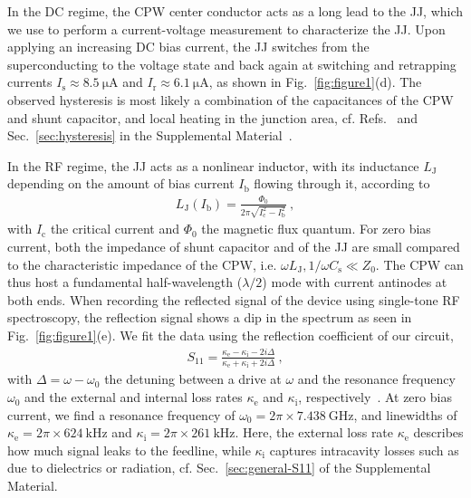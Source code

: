% 
In the DC regime, the CPW center conductor acts as a long lead to the JJ, which we use to perform a current-voltage measurement to characterize the JJ.
% 
Upon applying an increasing DC bias current, the JJ switches from the superconducting to the voltage state and back again at switching and retrapping currents $I_\text{s}\approx\SI{8.5}{\micro\ampere}$ and $I_\text{r}\approx\SI{6.1}{\micro\ampere}$, as shown in Fig.~\ref{fig:figure1}(d).
% 
The observed hysteresis is most likely a combination of the capacitances of the CPW and shunt capacitor, and local heating in the junction area, cf. Refs.~\cite{tinkhamIntroductionSuperconductivity1996,skocpolSelfHeatingHotspots1974,hazraHysteresisSuperconductingShort2010,kumarReversibilitySuperconductingNb2015} and Sec.~\ref{sec:hysteresis} in the Supplemental Material~\cite{SeeSupplementalMaterial}.

In the RF regime, the JJ acts as a nonlinear inductor, with its inductance $L_\text{J}$ depending on the amount of bias current $I_\text{b}$ flowing through it, according to
% 
\begin{align}
L_\text{J}(I_\text{b})= \frac{\Phi_0}{2\pi \sqrt{I_\text{c}^2-I_\text{b}^2}}\ ,
\label{eq:Lj-of-I}
\end{align}
% 
with $I_\text{c}$ the critical current and $\Phi_0$ the magnetic flux quantum.
% 
For zero bias current, both the impedance of shunt capacitor and of the JJ are small compared to the characteristic impedance of the CPW, i.e. $\omega L_\text{J},1/\omega C_\text{s} \ll Z_0$.
% 
The CPW can thus host a fundamental half-wavelength ($\lambda/2$) mode with current antinodes at both ends.
% 
When recording the reflected signal of the device using single-tone RF spectroscopy, the reflection signal shows a dip in the spectrum as seen in Fig.~\ref{fig:figure1}(e).
% 
We fit the data using the reflection coefficient of our circuit,
% 
\begin{align}
S_{11} = \frac{\kappa_\text{e}-\kappa_\text{i}-2i\Delta}{\kappa_\text{e}+\kappa_\text{i}+2i\Delta}\ ,
\label{eq:general:S11}
\end{align}
% 
with $\Delta=\omega-\omega_0$ the detuning between a drive at $\omega$ and the resonance frequency $\omega_0$ and the external and internal loss rates $\kappa_\text{e}$ and $\kappa_\text{i}$, respectively~\cite{bosmanBroadbandArchitectureGalvanically2015c}.
% 
At zero bias current, we find a resonance frequency of $\omega_0=2\pi\times\SI{7.438}{\giga\hertz}$, and linewidths of $\kappa_\text{e}=2\pi\times\SI{624}{\kilo\hertz}$ and $\kappa_\text{i}=2\pi\times\SI{261}{\kilo\hertz}$.
%
Here, the external loss rate $\kappa_\text{e}$ describes how much signal leaks to the feedline, while $\kappa_\text{i}$ captures intracavity losses such as due to dielectrics or radiation, cf. Sec.~\ref{sec:general-S11} of the Supplemental Material.

